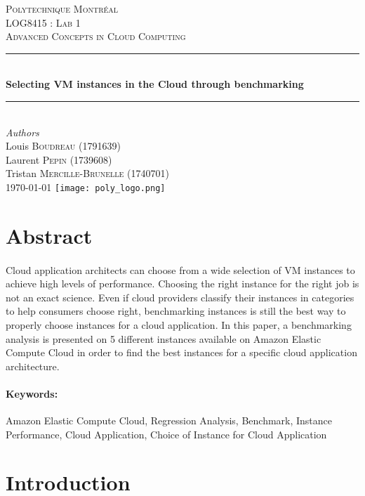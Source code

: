 \documentclass[11pt]{article}
\begin{document}
\begin{titlepage} 
	\newcommand{\HRule}{\rule{\linewidth}{0.5mm}}
	\center
	\textsc{\LARGE Polytechnique Montréal}\\[1.5cm]
	\textsc{\Large LOG8415 : Lab 1}\\[0.5cm]
	\textsc{\large Advanced Concepts in Cloud Computing}\\[0.5cm]
	\HRule\\[0.4cm]
	{\huge\bfseries Selecting VM instances in the Cloud through
	benchmarking}\\[0.4cm]
	\HRule\\[1.5cm]
	{\large\textit{Authors}}\\
	Louis \textsc{Boudreau} (1791639)\\
	Laurent \textsc{Pepin} (1739608)\\
	Tristan \textsc{Mercille-Brunelle} (1740701)\\
	\vfill\vfill\vfill {\large\today} \vfill\vfill
	\texttt{[image: poly\_logo.png]}\\[1cm]
	\vfill
\end{titlepage}

\tableofcontents

\section{Abstract}
	\paragraph{} Cloud application architects can choose from a wide selection
	of VM instances to achieve high levels of performance. Choosing the right
	instance for the right job is not an exact science. Even if cloud providers
	classify their instances in categories to help consumers choose right,
	benchmarking instances is still the best way to properly choose instances
	for a cloud application. In this paper, a benchmarking analysis is presented
	on 5 different instances available on Amazon Elastic Compute Cloud in order
	to find the best instances for a specific cloud application architecture.

	\paragraph{Keywords:}Amazon Elastic Compute Cloud, Regression Analysis,
	Benchmark, Instance Performance, Cloud Application, Choice of Instance for
	Cloud Application
	\pagebreak

\section{Introduction} \label{sec:introduction}
\end{document}
